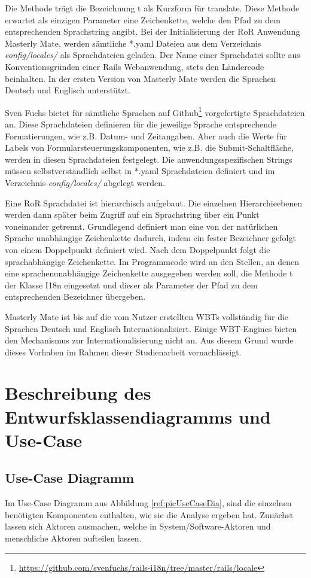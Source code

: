 Die Methode trägt die Bezeichnung t als Kurzform für
translate. Diese Methode erwartet als einzigen Parameter eine Zeichenkette,
welche den Pfad zu dem entsprechenden Sprachstring angibt. Bei der
Initialisierung der RoR Anwendung Masterly Mate, werden sämtliche *.yaml Dateien
aus dem Verzeichnis \textit{config/locales/} als Sprachdateien geladen. Der Name
einer Sprachdatei sollte aus Konventionsgründen einer Rails Webanwendung, stets den
Ländercode beinhalten. In der ersten Version von Masterly Mate werden die
Sprachen Deutsch und Englisch unterstützt. 

Sven Fuchs bietet für sämtliche Sprachen auf
Github\footnote{\url{https://github.com/svenfuchs/rails-i18n/tree/master/rails/locale}} 
vorgefertigte Sprachdateien an. Diese Sprachdateien definieren für die jeweilige
Sprache entsprechende Formatierungen, wie z.B. Datum- und Zeitangaben. Aber auch
die Werte für Labels von Formularsteuerungskomponenten, wie z.B. die Submit-Schaltfläche, werden in
diesen Sprachdateien festgelegt. Die anwendungsspezifischen Strings müssen
selbstverständlich selbst in *.yaml Sprachdateien definiert und im Verzeichnis
\textit{config/locales/} abgelegt werden. 

Eine RoR Sprachdatei ist hierarchisch aufgebaut. Die einzelnen Hierarchieebenen
werden dann später beim Zugriff auf ein Sprachstring über ein Punkt voneinander
getrennt. Grundlegend definiert man eine von der natürlichen Sprache unabhängige
Zeichenkette dadurch, indem ein fester Bezeichner gefolgt von einem Doppelpunkt
definiert wird. Nach dem Doppelpunkt folgt die sprachabhängige Zeichenkette. Im
Programmcode wird an den Stellen, an denen eine sprachenunabhängige Zeichenkette
ausgegeben werden soll, die Methode t der Klasse I18n eingesetzt und dieser als
Parameter der Pfad zu dem entsprechenden Bezeichner übergeben.

Masterly Mate ist bis auf die vom Nutzer erstellten WBTs vollständig für die
Sprachen Deutsch und Englisch Internationalisiert. Einige WBT-Engines bieten
den Mechanismus zur Internationalisierung nicht an. Aus diesem Grund wurde
dieses Vorhaben im Rahmen dieser Studienarbeit vernachlässigt.

\section{Beschreibung des Entwurfsklassendiagramms und
Use-Case}\label{ref:classModel}

\subsection{Use-Case Diagramm}
Im Use-Case Diagramm aus Abbildung \ref{ref:picUseCaseDia}, sind die einzelnen
benötigten Komponenten enthalten, wie sie die Analyse ergeben hat. Zunächst
lassen sich Aktoren ausmachen, welche in System/Software-Aktoren und menschliche
Aktoren aufteilen lassen.

